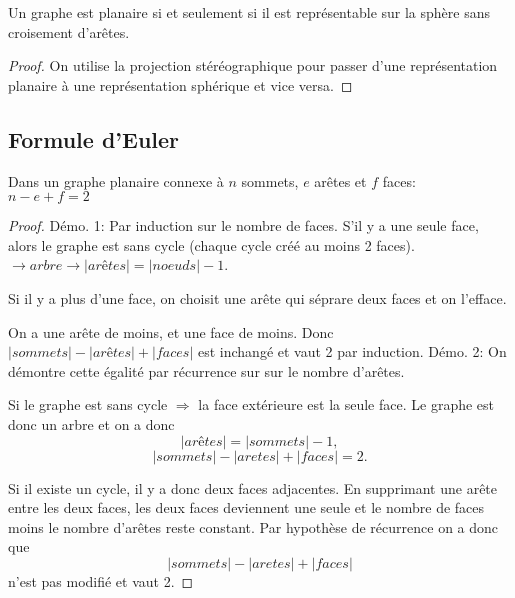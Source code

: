 \begin{mytheo}
  Un graphe est planaire si et seulement si il est représentable sur la sphère sans croisement d'arêtes.
  \begin{proof}
  On utilise la projection stéréographique pour passer d'une représentation planaire à une représentation sphérique et vice versa.
  \end{proof}
\end{mytheo}

\subsection{Formule d'Euler}
\begin{mytheo} 
  Dans un graphe planaire connexe à $n$ sommets, $e$ arêtes et $f$ faces:\\
  $n−e+f =2$
  \begin{proof}
  Démo. 1:
    Par induction sur le nombre de faces.
    S'il y a une seule face, alors le graphe est sans cycle (chaque cycle créé au moins 2 faces).
    $\rightarrow arbre \rightarrow |arêtes| = |noeuds|-1$.
    
    Si il y a plus d'une face, on choisit une arête qui séprare deux faces et on l'efface.
    
    On a une arête de moins, et une face de moins. Donc $|sommets| - |arêtes| + |faces|$ est inchangé et vaut 2 par induction.
  \newline
  Démo. 2:
    On démontre cette égalité par récurrence sur sur le nombre d'arêtes. 
    	
    Si le graphe est sans cycle $\Rightarrow$ la face extérieure est la seule face. Le graphe est donc un arbre et on a donc 
    $$|arêtes|= |sommets|-1,$$ 
    $$|sommets| - |aretes| + |faces|= 2.$$	
    
  Si il existe un cycle, il y a donc deux faces adjacentes. En supprimant une arête entre les deux faces, les deux faces deviennent une seule et le nombre de faces moins le nombre d'arêtes reste constant. Par hypothèse de récurrence on a donc que  
  $$|sommets| - |aretes| + |faces|$$ 
  n'est pas modifié et vaut 2.
  \end{proof}
\end{mytheo}

